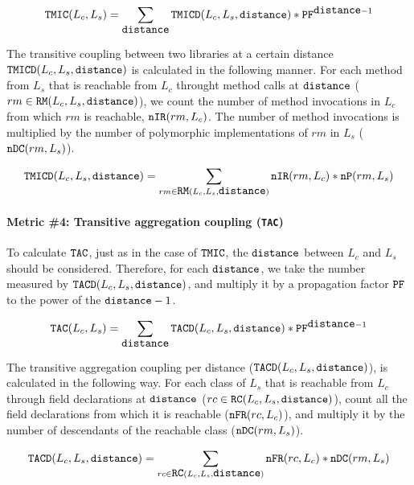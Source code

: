 \begin{equation}
\label{eqn:tmic}
  \verb|TMIC|(L_c,L_s) = \sum_{\verb|distance|} \verb|TMICD|(L_c,L_s, \verb|distance|) * \verb|PF|^{\verb|distance| - 1}
\end{equation}

The transitive coupling between two libraries at a certain distance $\verb|TMICD|(L_c, L_s, \verb|distance|)$ is calculated in the following manner. For each method from $L_s$ that is reachable from $L_c$ throught method calls at $\verb|distance|$ ($rm \in \verb|RM|(L_c,L_s,\verb|distance|)$), we count the number of method invocations in $L_c$ from which $rm$ is reachable, $\verb|nIR|(rm, L_c)$. The number of method invocations is multiplied by the number of polymorphic implementations of $rm$ in $L_s$ ($\verb|nDC|(rm, L_s)$).

\begin{equation}
\label{eqn:imic}
  \verb|TMICD|(L_c,L_s,\verb|distance|) = \sum_{rm \in \verb|RM|(L_c,L_s,\verb|distance|)} \verb|nIR|(rm,L_c) * \verb|nP|(rm, L_s)
\end{equation}

\paragraph{Metric \#4: Transitive aggregation coupling (\texttt{TAC})}
To calculate $\verb|TAC|$, just as in the case of $\verb|TMIC|$, the $\verb|distance|$ between $L_c$ and $L_s$ should be considered. Therefore, for each $\verb|distance|$, we take the number measured by $\verb|TACD|(L_c,L_s, \verb|distance|)$, and multiply it by a propagation factor $\verb|PF|$ to the power of the $\verb|distance| - 1$.

\begin{equation}
\label{eqn:tac}
  \verb|TAC|(L_c,L_s) = \sum_{\verb|distance|} \verb|TACD|(L_c,L_s, \verb|distance|) * \verb|PF|^{\verb|distance| - 1}
\end{equation}

The transitive aggregation coupling per distance ($\verb|TACD|(L_c, L_s, \verb|distance|)$), is calculated in the following way. For each class of $L_s$ that is reachable from $L_c$ through field declarations at $\verb|distance|$ ($rc \in \verb|RC|(L_c,L_s,\verb|distance|)$), count all the field declarations from which it is reachable ($\verb|nFR|(rc,L_c)$), and multiply it by the number of descendants of the reachable class ($\verb|nDC|(rm, L_s)$).

\begin{equation}
\label{eqn:iac}
  \verb|TACD|(L_c,L_s,\verb|distance|) = \sum_{rc \in \verb|RC|(L_c,L_s,\verb|distance|)} \verb|nFR|(rc,L_c) * \verb|nDC|(rm, L_s)
\end{equation}

